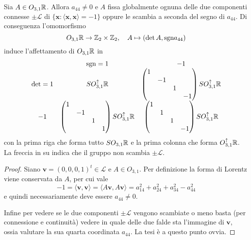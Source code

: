 \begin{lemma}
	Sia $A\in O_{3,1}\mathbb{R}$. Allora $a_{44}\neq0$ e $A$ fissa globalmente ognuna delle due componenti connesse $\pm\mathcal L$ di $\{\mathbf x:\langle \mathbf x,\mathbf x\rangle = -1\}$ oppure le scambia a seconda del segno di $a_{44}$.
	Di conseguenza l'omomorfismo 
	$$O_{3,1}\mathbb{R}\to\mathbb Z_{2}\times\mathbb Z_{2},\quad A\mapsto(\det A, \text{sgn}a_{44})$$
	induce l'affettamento di $O_{3,1}\mathbb{R}$ in
	$$\begin{matrix}
	   & \text{sgn}=1 & -1\\
	 \det = 1 & SO_{3,1}^{\uparrow}\mathbb{R} & \begin{pmatrix}1 & & & \\ & -1 & & \\ & & 1 & \\ & & & -1\end{pmatrix}SO_{3,1}^{\uparrow}\mathbb{R}\\
	 -1 & \begin{pmatrix}1 & & & \\ & -1 & & \\ & & 1 & \\ & & & 1\end{pmatrix}SO_{3,1}^{\uparrow}\mathbb{R} & \begin{pmatrix}1 & & & \\ & 1 & & \\ & & 1 & \\ & & & -1\end{pmatrix}SO_{3,1}^{\uparrow}\mathbb{R}
	\end{matrix}$$ 
	con la prima riga che forma tutto $SO_{3,1}\mathbb{R}$ e la prima colonna che forma $O_{3,1}^{\uparrow}\mathbb{R}$. La freccia in su indica che il gruppo non scambia $\pm\mathcal L$.
\end{lemma}
\begin{proof}
	Siano $\mathbf v = (0,0,0,1)^{t}\in\mathcal L$ e $A\in O_{3,1}$. 
	Per definizione la forma di Lorentz viene conservata da $A$, per cui vale 
	$$-1 = \langle \mathbf v,\mathbf v\rangle = \langle A\mathbf v, A\mathbf v\rangle = a_{14}^{2} + a_{24}^{2} + a_{34}^{2}-a_{44}^{2}$$
	e quindi necessariamente deve essere $a_{44}\neq0$.
	
	Infine per vedere se le due componenti $\pm\mathcal L$ vengono scambiate o meno basta (per connessione e continuità) vedere in quale delle due falde sta l'immagine di $\mathbf v$, ossia valutare la sua quarta coordinata $a_{44}$. La tesi è a questo punto ovvia.
\end{proof}


